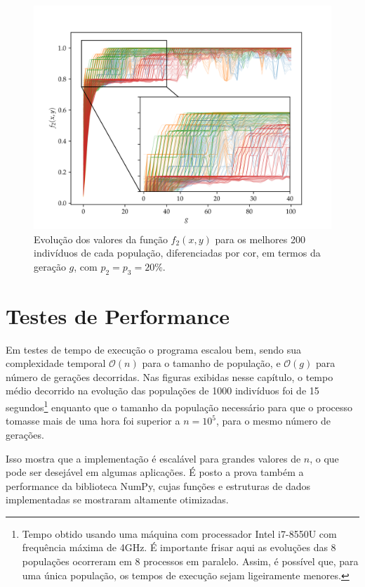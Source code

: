 \begin{figure}[p]
    \centering
    \includegraphics[width=\textwidth]{imagens/high_prob/evolution_near_gaussians.png}
    \caption{
        Evolução dos valores da função $ f_2(x,y) $ para os
        melhores 200 indivíduos de cada população, diferenciadas por cor, em termos da geração $g$,
        com $ p_2 = p_3 = 20\% $.
    }
    \label{fig:evolution_near_gaussians_mut_20}
\end{figure}

\section{Testes de Performance}

Em testes de tempo de execução o programa escalou bem, sendo sua complexidade temporal $\mathcal{O}(n)$ para o
tamanho de população, e $\mathcal{O}(g)$ para número de gerações decorridas. 
Nas figuras exibidas nesse capítulo, o tempo médio decorrido na evolução das populações de 1000 indivíduos
foi de 15 segundos\footnote{
    Tempo obtido usando uma máquina com processador Intel i7-8550U com frequência máxima de 4GHz.
    É importante frisar aqui as evoluções das 8 populações ocorreram em 8 processos em paralelo.
    Assim, é possível que, para uma única população, os tempos de execução sejam ligeiramente menores.
} enquanto que o tamanho da população necessário para que o processo tomasse mais de uma hora foi
superior a $n = 10^5$, para o mesmo número de gerações.

Isso mostra que a implementação é escalável para grandes valores de $n$, o que pode ser desejável em
algumas aplicações. É posto a prova também a performance da biblioteca NumPy, cujas funções e estruturas
de dados implementadas se mostraram altamente otimizadas.